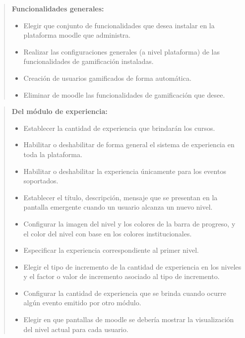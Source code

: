     \begin{quote}
    {\bf Funcionalidades generales:}
        \begin{itemize}
        \item Elegir que conjunto de funcionalidades que desea instalar
              en la plataforma moodle que administra.
        \item Realizar las configuraciones generales (a nivel plataforma) de las
              funcionalidades de gamificación instaladas.
        \item Creación de usuarios gamificados de forma automática.
        \item Eliminar de moodle las funcionalidades de gamificación que desee.
        \end{itemize}
    \end{quote}

    \begin{quote}
    {\bf Del módulo de experiencia:}
        \begin{itemize}
        \item Establecer la cantidad de experiencia que brindarán los cursos.
        \item Habilitar o deshabilitar de forma general el sistema de experiencia
              en toda la plataforma.
        \item Habilitar o deshabilitar la experiencia únicamente para los eventos
              soportados.
        \item Establecer el título, descripción, mensaje que se presentan en la
              pantalla emergente cuando un usuario alcanza un nuevo nivel.
        \item Configurar la imagen del nivel y los colores de la barra de progreso,
              y el color del nivel con base en los colores institucionales.
        \item Especificar la experiencia correspondiente al primer nivel.
        \item Elegir el tipo de incremento de la cantidad de experiencia en los
              niveles y el factor o valor de incremento asociado al tipo de
              incremento.
        \item Configurar la cantidad de experiencia que se brinda cuando ocurre
              algún evento emitido por otro módulo.
        \item Elegir en que pantallas de moodle se debería mostrar la
              visualización del nivel actual para cada usuario.
        \end{itemize}
    \end{quote}

